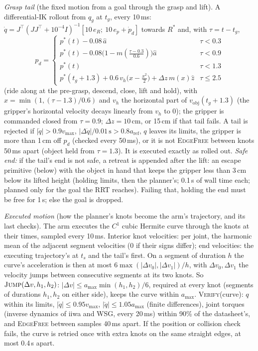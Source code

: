 \documentclass[conference]{IEEEtran}
\begin{document}
\emph{Grasp tail} (the fixed motion from a goal through the grasp and lift). A differential-IK rollout from $q_g$ at
$t_g$, every 10\,ms: $\dot q=J^\top(JJ^\top+10^{-4}I)^{-1}[10\,e_R;\ 10\,e_p+\dot p_d]$ towards $R^*$ and, with
$\tau=t-t_g$,
\begin{equation*}
p_d=\begin{cases}
p^*(t)-0.08\,\hat a & \tau<0.3\\
p^*(t)-0.08\big(1-m(\tfrac{\tau-0.3}{0.6})\big)\hat a & \tau<0.9\\
p^*(t) & \tau<1.3\\
p^*(t_g{+}1.3)+0.6\,v_h\big(x-\tfrac{x^2}{2}\big)+\Delta z\,m(x)\hat z & \tau\le2.5
\end{cases}
\end{equation*}
(ride along at the pre-grasp, descend, close, lift and hold), with $x=\min(1,(\tau-1.3)/0.6)$ and $v_h$ the horizontal part of $v_{\text{obj}}(t_g{+}1.3)$ (the gripper's
horizontal velocity decays linearly from $v_h$ to 0); the gripper is commanded closed from $\tau=0.9$; $\Delta z=10$\,cm, or 15\,cm if that tail fails. A tail is rejected if
$|\dot q|>0.9v_{\max}$, $|\Delta\dot q|/0.01\,\text{s}>0.8a_{\text{ref}}$, $q$ leaves its limits, the gripper is more
than 1\,cm off $p_d$ (checked every 50\,ms), or it is not \textsc{EdgeFree} between knots 50\,ms apart (object held
from $\tau=1.3$). It is executed exactly as rolled out. \emph{Safe end:} if the tail's end is not safe, a retreat is
appended after the lift: an escape primitive (below) with the object in hand that keeps the gripper less than 3\,cm
below its lifted height (holding limits, then the planner's; 0.1\,s of wall time each; planned only for the goal the RRT
reaches). Failing that, holding the end must be free for 1\,s; else the goal is dropped.

\emph{Executed motion} (how the planner's knots become the arm's trajectory, and its last checks). The arm executes the
$C^1$ cubic Hermite curve through the knots at their times, sampled every 10\,ms. Interior knot velocities: per
joint, the harmonic mean of the adjacent segment velocities (0 if their signs differ); end velocities: the executing
trajectory's at $t_s$ and the tail's first. On a segment of duration $h$ the curve's acceleration is then at most
$6\max(|\Delta v_0|,|\Delta v_1|)/h$, with $\Delta v_0,\Delta v_1$ the velocity jumps between consecutive segments at
its two knots. So $\textsc{Jump}(\Delta v,h_1,h_2)$: $|\Delta v|\le a_{\max}\min(h_1,h_2)/6$, required at every
knot (segments of durations $h_1,h_2$ on either side), keeps the curve within $a_{\max}$. \textsc{Verify}(curve): $q$
within its limits, $|\dot q|\le0.95v_{\max}$, $|\ddot q|\le1.05a_{\max}$ (finite differences), joint torques
(inverse dynamics of iiwa and WSG, every 20\,ms) within 90\% of the datasheet's, and \textsc{EdgeFree} between
samples 40\,ms apart. If the position or collision check fails, the curve is retried once with extra knots on the
same straight edges, at most 0.4\,s apart.
\end{document}
